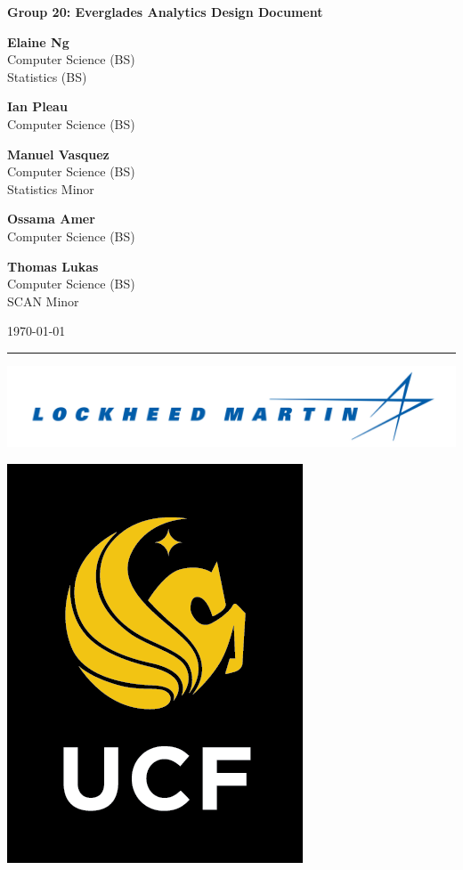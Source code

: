 \documentclass[a4paper,12pt]{report}
\newcommand{\authorname}[3]{
    \begin{minipage}[t]{.25\linewidth}
        \centering
        \textbf{#1} \\
        \small #2 \\
        #3
    \end{minipage}
}
\newenvironment{bottom}{\par\vspace*{\fill}}{\clearpage}
\begin{document}
\begin{titlepage}
    \centering
    \Large\textbf{Group 20: Everglades Analytics Design Document}
    \normalsize
    \vspace*{.25in}
    
    
    \authorname{Elaine Ng}{Computer Science (BS)}{Statistics (BS)}
    \authorname{Ian Pleau}{Computer Science (BS)}{}
    \authorname{Manuel Vasquez}{Computer Science (BS)}{Statistics Minor}
    \vspace*{.125in}
    
    \authorname{Ossama Amer}{Computer Science (BS)}{}
    \authorname{Thomas Lukas}{Computer Science (BS)}{SCAN Minor}
    
    \vspace*{.25in}
    \today
    
    \vspace*{.4in}
    \noindent\rule{.5\linewidth}{.4pt}
    \vspace*{.4in}

        \begin{minipage}[c]{.35\linewidth}
            \centering
            \includegraphics[width=1\linewidth]{media/lm.png}
        \end{minipage}
        \begin{minipage}[c]{.3\linewidth}
            \centering
            \includegraphics[width=.2\linewidth]{media/ucf.png}
        \end{minipage}
\end{titlepage}

\onehalfspacing
{}
\end{document}
